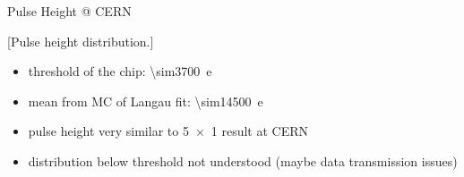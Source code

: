 \begin{frame}{Pulse Height @ CERN}

	\vspace*{-2ex}[Pulse height distribution.]\vspace*{-2ex}
	
	\begin{itemize}\itemfill
		\item threshold of the chip: \SI{\sim3700}{e}
		\item mean from MC of Langau fit: \SI{\sim14500}{e}
		\item pulse height very similar to \SI{5x1}{} result at CERN
		\item distribution below threshold not understood (maybe data transmission issues)
	\end{itemize}
	
\end{frame}
